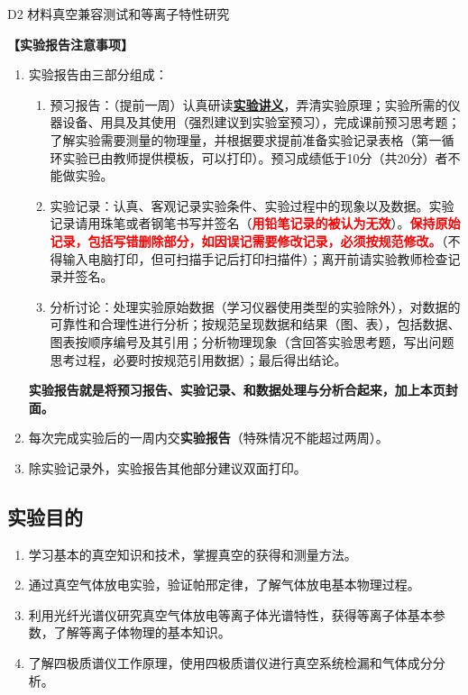 \documentclass[dvipsnames, svgnames,a4paper,11pt]{article}
\begin{document}
\scoresTable{}{}{}{}{}{}{}{}


\begin{center}
	\LARGE D2 \quad 材料真空兼容测试和等离子特性研究
\end{center}

\textbf{【实验报告注意事项】}
\begin{enumerate}
	\item 实验报告由三部分组成：
	\begin{enumerate}
		\item 预习报告：（提前一周）认真研读\underline{\textbf{实验讲义}}，弄清实验原理；实验所需的仪器设备、用具及其使用（强烈建议到实验室预习），完成课前预习思考题；了解实验需要测量的物理量，并根据要求提前准备实验记录表格（第一循环实验已由教师提供模板，可以打印）。预习成绩低于10分（共20分）者不能做实验。
	    \item 实验记录：认真、客观记录实验条件、实验过程中的现象以及数据。实验记录请用珠笔或者钢笔书写并签名（\textcolor{red}{\textbf{用铅笔记录的被认为无效}}）。\textcolor{red}{\textbf{保持原始记录，包括写错删除部分，如因误记需要修改记录，必须按规范修改。}}（不得输入电脑打印，但可扫描手记后打印扫描件）；离开前请实验教师检查记录并签名。
	    \item 分析讨论：处理实验原始数据（学习仪器使用类型的实验除外），对数据的可靠性和合理性进行分析；按规范呈现数据和结果（图、表），包括数据、图表按顺序编号及其引用；分析物理现象（含回答实验思考题，写出问题思考过程，必要时按规范引用数据）；最后得出结论。
	\end{enumerate}
	\textbf{实验报告就是将预习报告、实验记录、和数据处理与分析合起来，加上本页封面。}
	\item 每次完成实验后的一周内交\textbf{实验报告}（特殊情况不能超过两周）。
	\item 除实验记录外，实验报告其他部分建议双面打印。
\end{enumerate}


\clearpage
\tableofcontents
\clearpage

\setcounter{section}{0}
	
\subsection{实验目的}
\begin{enumerate}
	\item 学习基本的真空知识和技术，掌握真空的获得和测量方法。
	\item 通过真空气体放电实验，验证帕邢定律，了解气体放电基本物理过程。
	\item 利用光纤光谱仪研究真空气体放电等离子体光谱特性，获得等离子体基本参数，了解等离子体物理的基本知识。
	\item 了解四极质谱仪工作原理，使用四极质谱仪进行真空系统检漏和气体成分分析。
\end{enumerate}
\end{document}
